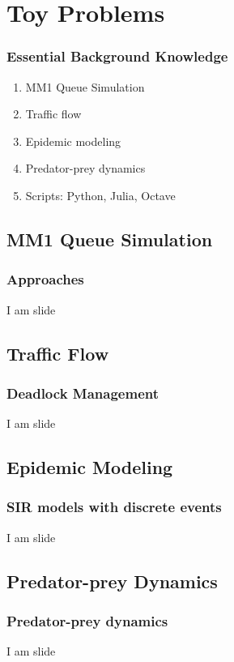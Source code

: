 % 

\section{Toy Problems}
%
\begin{frame}\frametitle{Essential Background Knowledge}
\begin{enumerate}
	\item MM1 Queue Simulation
	\item Traffic flow
	\item Epidemic modeling
	\item Predator-prey dynamics
	\item Scripts: Python, Julia, Octave
\end{enumerate}
\end{frame}

\subsection{MM1 Queue Simulation}
\begin{frame}\frametitle{Approaches}
	I am slide
\end{frame}

\subsection{Traffic Flow}
\begin{frame}\frametitle{Deadlock Management}
	I am slide
\end{frame}

\subsection{Epidemic Modeling}
\begin{frame}\frametitle{SIR models with discrete events}
	I am slide
\end{frame}

\subsection{Predator-prey Dynamics}
\begin{frame}\frametitle{Predator-prey dynamics}
	I am slide
\end{frame}

\endinput  %
